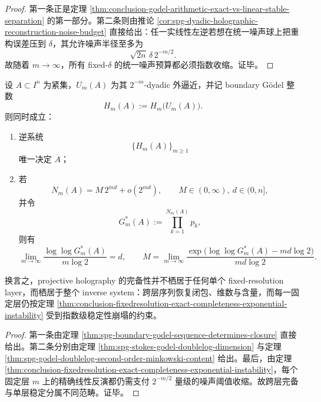 \begin{proof}
第一条正是定理 \ref{thm:conclusion-godel-arithmetic-exact-vs-linear-stable-separation} 的第一部分。第二条则由推论 \ref{cor:spg-dyadic-holographic-reconstruction-noise-budget} 直接给出：任一实线性左逆若想在统一噪声球上把重构误差压到 \(\delta\)，其允许噪声半径至多为
\[
\sqrt{2n}\,\delta\,2^{-m/2}.
\]
故随着 \(m\to\infty\)，所有 fixed-\(\delta\) 的统一噪声预算都必须指数收缩。证毕。
\end{proof}

\begin{theorem}\label{thm:conclusion-projective-holography-crossresolution-vs-singlelayer}
设 \(A\subset I^n\) 为紧集，\(U_m(A)\) 为其 \(2^{-m}\)-dyadic 外逼近，并记 boundary Gödel 整数
\[
H_m(A):=H_m\!\bigl(U_m(A)\bigr).
\]
则同时成立：
\begin{enumerate}
  \item 逆系统
        \[
        \{H_m(A)\}_{m\ge 1}
        \]
        唯一决定 \(\overline A\)；
  \item 若
        \[
        N_m(A)=M\,2^{md}+o(2^{md}),
        \qquad
        M\in(0,\infty),\ d\in(0,n],
        \]
        并令
        \[
        G_m^\ast(A):=\prod_{k=1}^{N_m(A)}p_k,
        \]
        则有
        \[
        \lim_{m\to\infty}
        \frac{\log\log G_m^\ast(A)}{m\log 2}
        =d,
        \qquad
        M=
        \lim_{m\to\infty}
        \frac{
        \exp\!\bigl(\log\log G_m^\ast(A)-md\log 2\bigr)
        }{md\log 2}.
        \]
\end{enumerate}
换言之，projective holography 的完备性并不栖居于任何单个 fixed-resolution layer，而栖居于整个 inverse system：跨层序列恢复闭包、维数与含量，而每一固定层仍按定理 \ref{thm:conclusion-fixedresolution-exact-completeness-exponential-instability} 受到指数级稳定性崩塌的约束。
\end{theorem}

\begin{proof}
第一条由定理 \ref{thm:spg-boundary-godel-sequence-determines-closure} 直接给出。第二条分别由定理 \ref{thm:spg-stokes-godel-doublelog-dimension} 与定理 \ref{thm:spg-godel-doublelog-second-order-minkowski-content} 给出。最后，由定理 \ref{thm:conclusion-fixedresolution-exact-completeness-exponential-instability}，每个固定层 \(m\) 上的精确线性反演都仍需支付 \(2^{-m/2}\) 量级的噪声阈值收缩。故跨层完备与单层稳定分属不同范畴。证毕。
\end{proof}

